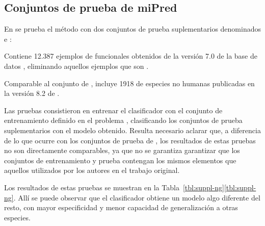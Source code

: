 %
%
\subsection{Conjuntos de prueba de miPred}
%
En \cite{ng} se prueba el método \work\mipred{} con dos conjuntos de
prueba suplementarios denominados  e :
%
\begin{description}
\item{}
  Contiene 12.387 ejemplos de  funcionales obtenidos de la
  versión 7.0 de la base de datos  \cite{rfam}, eliminando
  aquellos ejemplos que son .
\item{}
  Comparable al conjunto  de \cite{xue}, incluye
  1918  de especies no humanas publicadas en la versión 8.2
  de \work{\mirbase}.
\end{description}
%
Las pruebas consistieron en entrenar el clasificador con el conjunto
de entrenamiento definido en el problema \prob\mipred{}, clasificando
los conjuntos de prueba suplementarios con el modelo obtenido.
Resulta necesario aclarar que, a diferencia de lo que ocurre con los
conjuntos de prueba de \work\tripletsvm{}, los resultados de estas
pruebas no son directamente comparables, ya que no se garantiza
garantizar que los conjuntos de entrenamiento y prueba contengan los
mismos elementos que aquellos utilizados por los autores en el trabajo
original.

Los resultados de estas pruebas se muestran en la
\iflatexml{}Tabla~\ref{tbl:suppl-ng}\else\autoref{tbl:suppl-ng}\fi.
Allí se puede observar que el clasificador  obtiene un
modelo algo diferente del resto, con mayor especificidad y menor
capacidad de generalización a otras especies.
